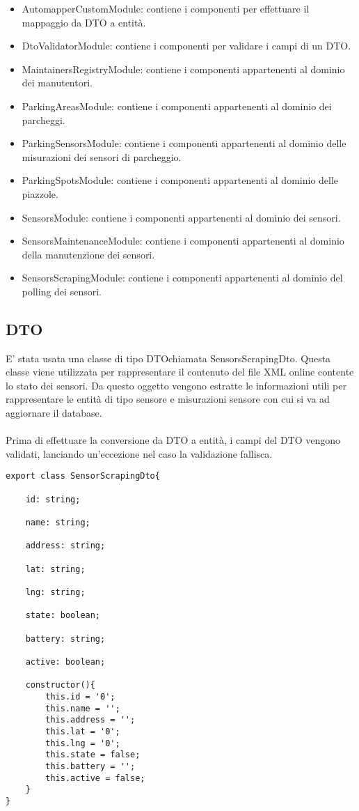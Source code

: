 \begin{itemize}
    \item AutomapperCustomModule: contiene i componenti per effettuare il mappaggio da DTO a entità.
    \item DtoValidatorModule: contiene i componenti per validare i campi di un DTO.
    \item MaintainersRegistryModule: contiene i componenti appartenenti al dominio dei manutentori.
    \item ParkingAreasModule: contiene i componenti appartenenti al dominio dei parcheggi.
    \item ParkingSensorsModule: contiene i componenti appartenenti al dominio delle misurazioni dei sensori di parcheggio.
    \item ParkingSpotsModule: contiene i componenti appartenenti al dominio delle piazzole.
    \item SensorsModule: contiene i componenti appartenenti al dominio dei sensori.
    \item SensorsMaintenanceModule: contiene i componenti appartenenti al dominio della manutenzione dei sensori.
    \item SensorsScrapingModule: contiene i componenti appartenenti al dominio del polling dei sensori.
\end{itemize}

\subsection{DTO}
E' stata usata una classe di tipo \gls{DTO}\glsfirstoccur chiamata SensorsScrapingDto. Questa classe viene utilizzata per rappresentare
il contenuto del file \gls{XML} online contente lo stato dei sensori. Da questo oggetto vengono estratte le informazioni
utili per rappresentare le entità di tipo sensore e misurazioni sensore con cui si va ad aggiornare il database.
\\\\
Prima di effettuare la conversione da \gls{DTO} a entità, i campi del \gls{DTO} vengono validati, lanciando un'eccezione nel caso 
la validazione fallisca.
\\
\begin{lstlisting}
export class SensorScrapingDto{
    
    id: string;

    name: string;

    address: string;

    lat: string;

    lng: string;

    state: boolean;

    battery: string;

    active: boolean;

    constructor(){
        this.id = '0';
        this.name = '';
        this.address = '';
        this.lat = '0';
        this.lng = '0';
        this.state = false;
        this.battery = '';
        this.active = false;
    }
}
\end{lstlisting}
